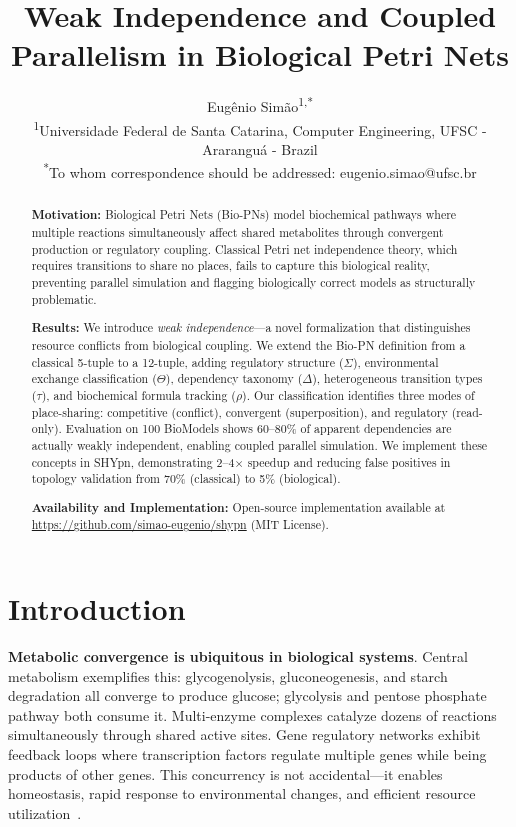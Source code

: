 \documentclass[twocolumn,11pt]{article}
\title{\textbf{Weak Independence and Coupled Parallelism in Biological Petri Nets}}
\author{
Eugênio Simão\textsuperscript{1,*}\\
\textsuperscript{1}Universidade Federal de Santa Catarina, Computer Engineering, UFSC - Araranguá - Brazil\\
\textsuperscript{*}To whom correspondence should be addressed: eugenio.simao@ufsc.br
}
\date{}
\begin{document}
\maketitle

\begin{abstract}
\textbf{Motivation:} Biological Petri Nets (Bio-PNs) model biochemical pathways where multiple reactions simultaneously affect shared metabolites through convergent production or regulatory coupling. Classical Petri net independence theory, which requires transitions to share no places, fails to capture this biological reality, preventing parallel simulation and flagging biologically correct models as structurally problematic.

\textbf{Results:} We introduce \emph{weak independence}---a novel formalization that distinguishes resource conflicts from biological coupling. We extend the Bio-PN definition from a classical 5-tuple to a 12-tuple, adding regulatory structure ($\Sigma$), environmental exchange classification ($\Theta$), dependency taxonomy ($\Delta$), heterogeneous transition types ($\tau$), and biochemical formula tracking ($\rho$). Our classification identifies three modes of place-sharing: competitive (conflict), convergent (superposition), and regulatory (read-only). Evaluation on 100 BioModels shows 60--80\% of apparent dependencies are actually weakly independent, enabling coupled parallel simulation. We implement these concepts in SHYpn, demonstrating 2--4$\times$ speedup and reducing false positives in topology validation from 70\% (classical) to 5\% (biological).

\textbf{Availability and Implementation:} Open-source implementation available at \url{https://github.com/simao-eugenio/shypn} (MIT License).
\end{abstract}

\section{Introduction}

\textbf{Metabolic convergence is ubiquitous in biological systems}. Central metabolism exemplifies this: glycogenolysis, gluconeogenesis, and starch degradation all converge to produce glucose; glycolysis and pentose phosphate pathway both consume it. Multi-enzyme complexes catalyze dozens of reactions simultaneously through shared active sites. Gene regulatory networks exhibit feedback loops where transcription factors regulate multiple genes while being products of other genes. This concurrency is not accidental---it enables homeostasis, rapid response to environmental changes, and efficient resource utilization~\cite{Alberts2015,Nelson2017}.
\end{document}
